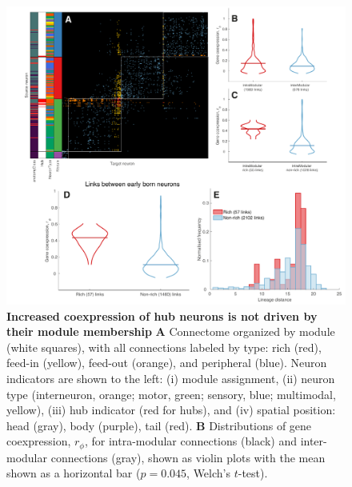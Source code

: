 \documentclass[10pt,letterpaper]{article}
\begin{document}
\begin{figure}[!h]
\centering
    \includegraphics[width=1\textwidth]{extras.pdf}
 \caption{
 \textbf{Increased coexpression of hub neurons is not driven by their module membership}
\textbf{A} Connectome organized by module (white squares), with all connections labeled by type: rich (red), feed-in (yellow), feed-out (orange), and peripheral (blue).
Neuron indicators are shown to the left:
(i) module assignment,
(ii) neuron type (interneuron, orange; motor, green; sensory, blue; multimodal, yellow),
(iii) hub indicator (red for hubs), and
(iv) spatial position: head (gray), body (purple), tail (red).
\textbf{B} Distributions of gene coexpression, $r_\phi$, for intra-modular connections (black) and inter-modular connections (gray), shown as violin plots with the mean shown as a horizontal bar ($p = 0.045$, Welch's $t$-test).
}
\end{figure}
\end{document}
